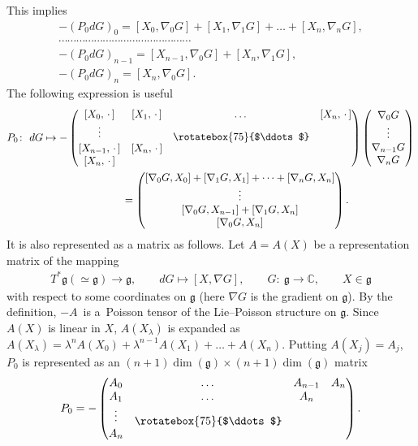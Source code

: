 \documentclass[10pt,a4paper]{amsart}
\numberwithin{equation}{section}
\begin{document}
This implies
\begin{gather*}
-(P_0dG)_0 = [X_0, \nabla _0G]+[X_1, \nabla _1G]+ \dots + [X_n, \nabla _nG],\\
\cdots\cdots\cdots\cdots\cdots\cdots\cdots\cdots\cdots\cdots\cdots\cdots\cdots\cdots\cdots\\
-(P_0dG)_{n-1} = [X_{n-1}, \nabla _0G] + [X_n, \nabla _1G] ,\\
-(P_0dG)_{n} = [X_{n}, \nabla _0G].
\end{gather*}
The following expression is useful
\begin{gather*}
P_0\colon \ dG \mapsto - \left(
\begin{matrix}
[X_0, \,\cdot \,] & [X_1, \,\cdot \,] & \dots & [X_n, \,\cdot \,] \\
\vdots & & \raisebox{-0.1cm}{\rotatebox{75}{$\ddots$}} & \\
 [X_{n-1}, \,\cdot \,] & [X_n, \,\cdot \,] & & \\
 [X_{n}, \,\cdot \,]& & &
\end{matrix}
\right) \left(
\begin{matrix}
\nabla _0G \\
\vdots \\
\nabla _{n-1}G \\
\nabla _nG
\end{matrix}\right) \\
\hphantom{P_0\colon \ dG \mapsto}{}
 = \left(
\begin{matrix}
[\nabla _0G, X_0]+[\nabla _1G, X_1] + \dots + [\nabla _nG, X_n] \\
\vdots \\
 [\nabla _0G, X_{n-1}]+[\nabla _1G, X_n] \\
 [\nabla _0G, X_n]
\end{matrix}\right).
\end{gather*}
It is also represented as a matrix as follows. Let $A = A(X)$ be a representation matrix of the mapping
\begin{gather*}
T^* \mathfrak{g} (\simeq \mathfrak{g}) \to \mathfrak{g}, \qquad dG \mapsto [X, \nabla G],
\qquad G\colon \ \mathfrak{g} \to \mathbb{C},\qquad X\in \mathfrak{g}
\end{gather*}
with respect to some coordinates on $\mathfrak{g}$ (here $\nabla G$ is the gradient on $\mathfrak{g}$). By the def\/inition, $-A$~is a~Poisson tensor of the Lie--Poisson structure on $\mathfrak{g}$. Since $A(X)$ is linear in $X$, $A(X_\lambda )$ is expanded as $A(X_\lambda ) = \lambda ^n A(X_0) + \lambda ^{n-1}A(X_1) + \dots + A(X_n)$. Putting $A(X_j) = A_j$, $P_0$ is represented as an $(n+1)\dim (\mathfrak{g}) \times (n+1)\dim (\mathfrak{g})$ matrix
\begin{gather*}
P_0 = - \left(
\begin{matrix}
A_0 & \dots & A_{n-1} & A_n \\
A_1 & \dots & A_n & \\[0.0cm]
\vdots & \raisebox{-0.1cm}{\rotatebox{75}{$\ddots$}} & & \\
A_n & & &
\end{matrix}
\right).
\end{gather*}
\end{document}
